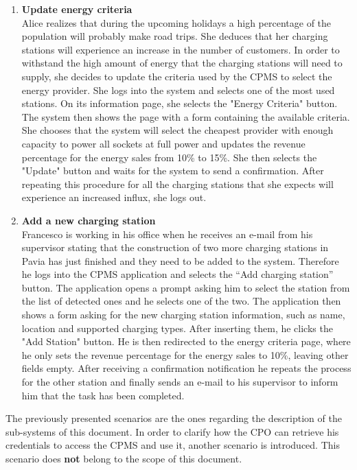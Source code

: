 \begin{enumerate}
\item \textbf{Update energy criteria}\\
Alice realizes that during the upcoming holidays a high percentage of the population will probably make road trips. She deduces that her charging stations will experience an increase in the number of customers. In order to withstand the high amount of energy that the charging stations will need to supply, she decides to update the criteria used by the CPMS to select the energy provider. She logs into the system and selects one of the most used stations. On its information page, she selects the "Energy Criteria" button. The system then shows the page with a form containing the available criteria. She chooses that the system will select the cheapest provider with enough capacity to power all sockets at full power and updates the revenue percentage for the energy sales from 10\% to 15\%. She then selects the "Update" button and waits for the system to send a confirmation. After repeating this procedure for all the charging stations that she expects will experience an increased influx, she logs out.
\item \textbf{Add a new charging station}\\
Francesco is working in his office when he receives an e-mail from his supervisor stating that the construction of two more charging stations in Pavia has just finished and they need to be added to the system. Therefore he logs into the CPMS application and selects the “Add charging station” button. The application opens a prompt asking him to select the station from the list of detected ones and he selects one of the two. The application then shows a form asking for the new charging station information, such as name, location and supported charging types. After inserting them, he clicks the "Add Station" button. He is then redirected to the energy criteria page, where he only sets the revenue percentage for the energy sales to 10\%, leaving other fields empty. After receiving a confirmation notification he repeats the process for the other station and finally sends an e-mail to his supervisor to inform him that the task has been completed.

\end{enumerate}
The previously presented scenarios are the ones regarding the description of the sub-systems of this document. In order to clarify how the CPO can retrieve his credentials to access the CPMS and use it, another scenario is introduced. This scenario does \textbf{not} belong to the scope of this document.
